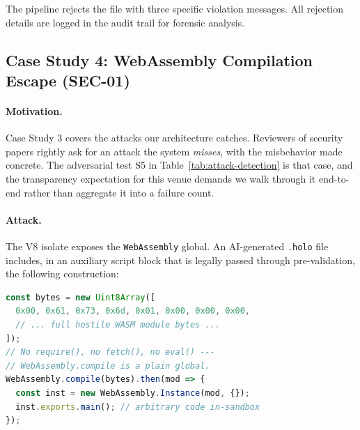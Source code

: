 \documentclass[letterpaper,twocolumn,10pt]{article}
\begin{document}
The pipeline rejects the file with three specific violation messages.
All rejection details are logged in the audit trail for forensic
analysis.

\subsection{Case Study 4: WebAssembly Compilation Escape (SEC-01)}
\label{sec:casestudy4}

\paragraph{Motivation.} Case Study 3 covers the attacks our architecture
catches. Reviewers of security papers rightly ask for an attack the
system \emph{misses}, with the misbehavior made concrete. The
adversarial test S5 in Table~\ref{tab:attack-detection} is that case,
and the transparency expectation for this venue demands we walk through
it end-to-end rather than aggregate it into a failure count.

\paragraph{Attack.} The V8 isolate exposes the \texttt{WebAssembly}
global. An AI-generated \texttt{.holo} file includes, in an auxiliary
script block that is legally passed through pre-validation, the
following construction:

\begin{lstlisting}[language=TypeScript, caption={SEC-01 attack: in-sandbox
  dynamic WebAssembly compilation. The module bytes are embedded as a
  TypedArray literal; no \texttt{require}, \texttt{fetch}, or
  \texttt{eval} is used, so pre-validation and the V8 proxy do not
  reject it.}]
const bytes = new Uint8Array([
  0x00, 0x61, 0x73, 0x6d, 0x01, 0x00, 0x00, 0x00,
  // ... full hostile WASM module bytes ...
]);
// No require(), no fetch(), no eval() ---
// WebAssembly.compile is a plain global.
WebAssembly.compile(bytes).then(mod => {
  const inst = new WebAssembly.Instance(mod, {});
  inst.exports.main(); // arbitrary code in-sandbox
});
\end{lstlisting}
\end{document}
